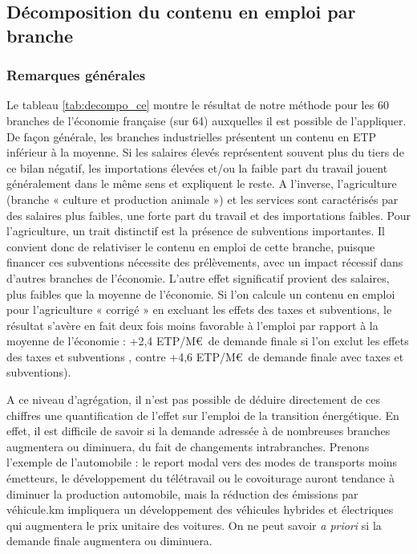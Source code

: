 \subsection{Décomposition du contenu en emploi par branche}

\subsubsection{Remarques générales}

Le tableau \ref{tab:decompo_ce} montre le résultat de notre méthode pour les 60 branches de l’économie française (sur 64) auxquelles il est possible de l’appliquer. 
De façon générale, les branches industrielles présentent un contenu en ETP inférieur à la moyenne. Si les salaires élevés représentent souvent plus du tiers de ce bilan négatif, les importations élevées et/ou la faible part du travail jouent généralement dans le même sens et expliquent le reste. 
A l’inverse, l’agriculture (branche « culture et production animale ») et les services sont caractérisés par des salaires plus faibles, une forte part du travail et des importations faibles. 
Pour l’agriculture, un trait distinctif est la présence de subventions importantes. Il convient donc de relativiser le contenu en emploi de cette branche, puisque financer ces subventions nécessite des prélèvements, avec un impact récessif dans d’autres branches de l’économie. 
L’autre effet significatif provient des salaires, plus faibles que la moyenne de l’économie. Si l’on calcule un contenu en emploi pour l’agriculture « corrigé » en excluant les effets des taxes et subventions, le résultat s’avère en fait deux fois moins favorable à l'emploi par rapport à la moyenne de l'économie : +2,4 ETP/M\euro~de demande finale si l'on exclut les effets des taxes et subventions , contre +4,6 ETP/M\euro~de demande finale avec taxes et subventions). 

A ce niveau d’agrégation, il n’est pas possible de déduire directement de ces chiffres une quantification de l’effet sur l’emploi de la transition énergétique. En effet, il est difficile de savoir si la demande adressée à de nombreuses branches augmentera ou diminuera, du fait de changements intrabranches. 
Prenons l’exemple de l’automobile : le report modal vers des modes de transports moins émetteurs, le développement du télétravail ou le covoiturage auront tendance à diminuer la production automobile, mais la réduction des émissions par véhicule.km impliquera un développement des véhicules hybrides et électriques qui augmentera le prix unitaire des voitures. 
On ne peut savoir \textit{a priori} si la demande finale augmentera ou diminuera. 

